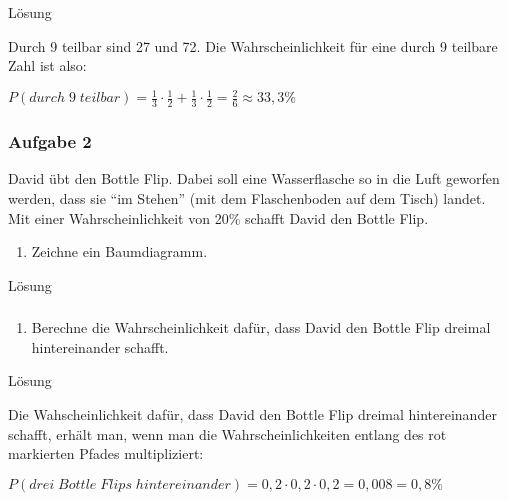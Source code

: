 \documentclass[
  ngerman,
]{book}
\providecommand{\tightlist}{%
  \setlength{\itemsep}{0pt}\setlength{\parskip}{0pt}}
\begin{document}
Lösung

Durch 9 teilbar sind 27 und 72. Die Wahrscheinlichkeit für eine durch 9 teilbare Zahl ist also:

\(P(durch\;9\;teilbar)= \frac{1}{3}\cdot\frac{1}{2} + \frac{1}{3}\cdot\frac{1}{2} = \frac{2}{6} \approx 33,3\%\)

\hypertarget{section-143}{%
\subsubsection*{}\label{section-143}}

\hypertarget{aufgabe-2-15}{%
\subsubsection*{Aufgabe 2}\label{aufgabe-2-15}}

David übt den Bottle Flip. Dabei soll eine Wasserflasche so in die Luft geworfen werden, dass sie ``im Stehen'' (mit dem Flaschenboden auf dem Tisch) landet. Mit einer Wahrscheinlichkeit von 20\% schafft David den Bottle Flip.

\begin{enumerate}
\def\labelenumi{\alph{enumi})}
\tightlist
\item
  Zeichne ein Baumdiagramm.
\end{enumerate}

Lösung

\hypertarget{section-144}{%
\subsubsection*{}\label{section-144}}

\begin{enumerate}
\def\labelenumi{\alph{enumi})}
\setcounter{enumi}{1}
\tightlist
\item
  Berechne die Wahrscheinlichkeit dafür, dass David den Bottle Flip dreimal hintereinander schafft.
\end{enumerate}

Lösung

Die Wahscheinlichkeit dafür, dass David den Bottle Flip dreimal hintereinander schafft, erhält man, wenn man die Wahrscheinlichkeiten entlang des rot markierten Pfades multipliziert:

\(P(drei\;Bottle\;Flips\;hintereinander)=0,2 \cdot 0,2 \cdot 0,2 = 0,008 =0,8\%\)
\end{document}
